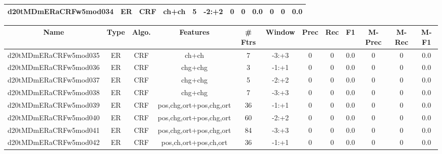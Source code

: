 \documentclass[a4paper]{article}
\begin{document}
\begin{landscape}
\begin{center}
\begin{tabular}{ |c|c|c|c|c|c|c|c|c|c|c|c|}
 
 	
 	\small{ d20tMDmERaCRFw5mod034 } & ER & CRF & ch+ch  &  5 &  -2:+2  &  0 & 0 & 0.0  &  0 & 0 & 0.0 \\
 	
 \hline
\end{tabular}
\end{center}




\begin{center}
\begin{tabular}{ |c|c|c|c|c|c|c|c|c|c|c|c|} 
 \hline
 	Name & Type & Algo. & Features & \# Ftrs & Window & Prec & Rec & F1 & M-Prec & M-Rec & M-F1\\
 \hline

 	

 
 	
 	\small{ d20tMDmERaCRFw5mod035 } & ER & CRF & ch+ch  &  7 &  -3:+3  &  0 & 0 & 0.0  &  0 & 0 & 0.0 \\
 	

 
 	
 	\small{ d20tMDmERaCRFw5mod036 } & ER & CRF & chg+chg  &  3 &  -1:+1  &  0 & 0 & 0.0  &  0 & 0 & 0.0 \\
 	

 
 	
 	\small{ d20tMDmERaCRFw5mod037 } & ER & CRF & chg+chg  &  5 &  -2:+2  &  0 & 0 & 0.0  &  0 & 0 & 0.0 \\
 	

 
 	
 	\small{ d20tMDmERaCRFw5mod038 } & ER & CRF & chg+chg  &  7 &  -3:+3  &  0 & 0 & 0.0  &  0 & 0 & 0.0 \\
 	

 
 	
 	\small{ d20tMDmERaCRFw5mod039 } & ER & CRF & pos,chg,ort+pos,chg,ort  &  36 &  -1:+1  &  0 & 0 & 0.0  &  0 & 0 & 0.0 \\
 	

 
 	
 	\small{ d20tMDmERaCRFw5mod040 } & ER & CRF & pos,chg,ort+pos,chg,ort  &  60 &  -2:+2  &  0 & 0 & 0.0  &  0 & 0 & 0.0 \\
 	

 
 	
 	\small{ d20tMDmERaCRFw5mod041 } & ER & CRF & pos,chg,ort+pos,chg,ort  &  84 &  -3:+3  &  0 & 0 & 0.0  &  0 & 0 & 0.0 \\
 	

 
 	
 	\small{ d20tMDmERaCRFw5mod042 } & ER & CRF & pos,ch,ort+pos,ch,ort  &  36 &  -1:+1  &  0 & 0 & 0.0  &  0 & 0 & 0.0 \\
 	


\end{tabular}
\end{center}
\end{landscape}
\end{document}
